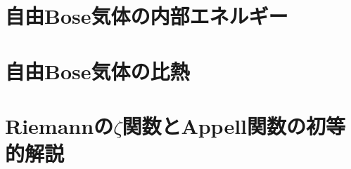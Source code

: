 \section{自由Bose気体の内部エネルギー}





































\section{自由Bose気体の比熱}







\section{Riemannの$\zeta$関数とAppell関数の初等的解説}
